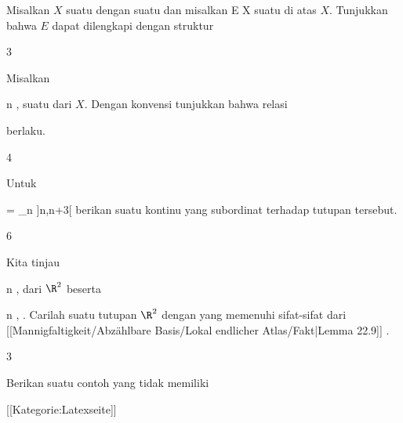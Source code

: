 {}
{

Misalkan $X$ suatu
dengan suatu
dan misalkan
 { E } { X
} {}
suatu
di atas $X$. Tunjukkan bahwa $E$ dapat dilengkapi dengan struktur

}
{} {}


{3}
{

Misalkan

 {}
 {n \in \N} {}
 {} {} {} {,}
suatu
 dari
 $X$. Dengan konvensi
tunjukkan bahwa relasi

 {  }
 berlaku.

}
{} {}

{4}
{

Untuk

\mavergleichskettedisp
{\vergleichskette
{ \R
}
{ =} { \bigcup_{n \in \Z} ]n,n+3[
}
{ } {
}
{ } {
}
{ } {
}
}
{}{}{}
berikan suatu
kontinu yang subordinat terhadap tutupan tersebut.

}
{} {}

{6}
{

Kita tinjau

 {}
 {n \in \N} {}
 {} {} {} {,}
dari $\R^2$ beserta

 {}
 {n \in \N} {}
 {} {} {} {,}
 {} {.}
Carilah suatu tutupan $\R^2$ dengan
yang memenuhi sifat-sifat
dari [[Mannigfaltigkeit/Abzählbare Basis/Lokal endlicher Atlas/Fakt|Lemma 22.9]]
 {} {}.

}
{} {}

{3}
{

Berikan suatu contoh
yang tidak memiliki

}
{} {}

 [[Kategorie:Latexseite]]

